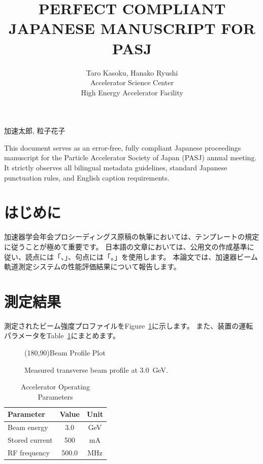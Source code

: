 \documentclass{article}
\begin{document}
\title{PERFECT COMPLIANT JAPANESE MANUSCRIPT FOR PASJ}

\jauthor
{
加速太郎,
粒子花子
}

\author
{
Taro Kasoku,
Hanako Ryushi\\
 Accelerator Science Center\\
 High Energy Accelerator Facility\\
}

\Abstract
{
This document serves as an error-free, fully compliant Japanese proceedings manuscript for the Particle Accelerator Society of Japan (PASJ) annual meeting. It strictly observes all bilingual metadata guidelines, standard Japanese punctuation rules, and English caption requirements.
}

\maketitle

\section{はじめに}
加速器学会年会プロシーディングス原稿の執筆においては、テンプレートの規定に従うことが極めて重要です。
日本語の文章においては、公用文の作成基準に従い、読点には「、」、句点には「。」を使用します。
本論文では、加速器ビーム軌道測定システムの性能評価結果について報告します。

\section{測定結果}
測定されたビーム強度プロファイルをFigure~\ref{fig:profile}に示します。
また、装置の運転パラメータをTable~\ref{tab:params}にまとめます。

\begin{figure}[htb]
\centering
\framebox(180,90){Beam Profile Plot}
\caption{Measured transverse beam profile at 3.0~GeV.}
\label{fig:profile}
\end{figure}

\begin{table}[htb]
\caption{Accelerator Operating Parameters}
\label{tab:params}
\centering
\begin{tabular}{lcc}
\hline
Parameter & Value & Unit \\
\hline
Beam energy & 3.0 & GeV \\
Stored current & 500 & mA \\
RF frequency & 500.0 & MHz \\
\hline
\end{tabular}
\end{table}
\end{document}
